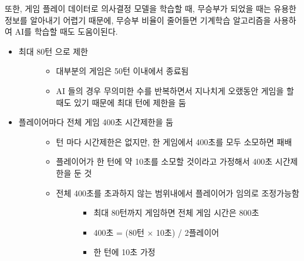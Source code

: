 \documentclass[letterpaper,10pt,english]{sphinxmanual}
\begin{document}
또한, 게임 플레이 데이터로 의사결정 모델을 학습할 때, 무승부가 되었을 때는 유용한 정보를 알아내기 어렵기 때문에,
무승부 비율이 줄어들면 기계학습 알고리즘을 사용하여 AI를 학습할 때도 도움이된다.
\begin{itemize}
\item {} \begin{description}
\item[{최대 80턴 으로 제한}] \leavevmode\begin{itemize}
\item {} 
대부분의 게임은 50턴 이내에서 종료됨

\item {} 
AI 들의 경우 무의미한 수를 반복하면서 지나치게 오랬동안 게임을 할 때도 있기 때문에 최대 턴에 제한을 둠

\end{itemize}

\end{description}

\item {} \begin{description}
\item[{플레이어마다 전체 게임 400초 시간제한을 둠}] \leavevmode\begin{itemize}
\item {} 
턴 마다 시간제한은 없지만, 한 게임에서 400초를 모두 소모하면 패배

\item {} 
플레이어가 한 턴에 약 10초를 소모할 것이라고 가정해서 400초 시간제한을 둔 것

\item {} \begin{description}
\item[{전체 400초를 초과하지 않는 범위내에서 플레이어가 임의로 조정가능함}] \leavevmode\begin{itemize}
\item {} 
최대 80턴까지 게임하면 전체 게임 시간은 800초

\item {} 
400초 = (80턴 \(\times\) 10초) / 2플레이어

\item {} 
한 턴에 10초 가정

\end{itemize}

\end{description}

\end{itemize}

\end{description}


\end{itemize}
\end{document}
